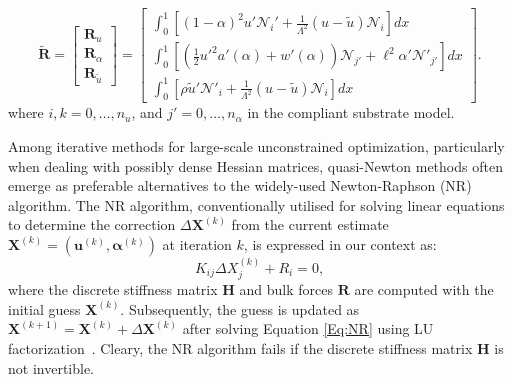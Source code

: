     {
        \begin{equation}
            \widetilde{\mathbf{R}} =
            \begin{bmatrix}
                \mathbf{R}_u      \\
                \mathbf{R}_\alpha \\
                \mathbf{R}_{\tilde u}
            \end{bmatrix}
            =
            \begin{bmatrix}
                \int_0^1 \left[
                    (1 - \alpha)^2 u' \mathcal{N}_i' + \frac{1}{\Lambda^2} (u - \tilde{u}) \mathcal{N}_i
                \right] dx \\
                \int_0^1 \left[
                (\frac{1}{2} u'^2 a'(\alpha) + w'(\alpha)) \mathcal{N}_{j'} + \ell^2 \alpha' \mathcal{N}'_{j'}
                \right] dx \\
                \int_0^1 \left[
                    \rho \tilde u' \mathcal{N}'_i + \frac{1}{\Lambda^2} (u - \tilde{u}) \mathcal{N}_i
                    \right] dx
            \end{bmatrix}.
            \label{residual2}
        \end{equation}
    }
where $i, k= 0, \dots, n_u$, and $j' = 0,\dots, n_\alpha$
in the compliant substrate model.

Among iterative methods for large-scale unconstrained optimization, particularly when dealing with possibly dense Hessian matrices,  quasi-Newton methods often emerge as preferable alternatives to the widely-used Newton-Raphson (NR) algorithm. The NR algorithm, conventionally utilised for solving linear equations to determine the correction $\Delta \mathbf{X}^{(k)}$ from the current estimate $\mathbf{X}^{(k)} = (\mathbf{u}^{(k)}, \boldsymbol{\alpha}^{(k)})$ at iteration $k$, is expressed in our context as:
\begin{equation}
    K_{ij} \Delta X_j^{(k)} + R_i = 0,
    \label{Eq:NR}
\end{equation}
where the discrete stiffness matrix $\mathbf{H}$ and bulk forces $\mathbf{R}$ are computed with the initial guess $\mathbf{X}^{(k)}$. Subsequently, the guess is updated as $\mathbf{X}^{(k+1)} = \mathbf{X}^{(k)} + \Delta \mathbf{X}^{(k)}$ after solving Equation \eqref{Eq:NR} using LU factorization~\cite{Sanderson2016-ht}. Cleary, the NR algorithm fails if the discrete stiffness matrix $\mathbf{H}$ is not invertible.

